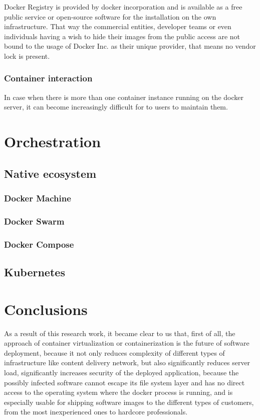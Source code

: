 Docker Registry is provided by docker incorporation and is available
as a free public service or open-source software
for the installation on the own infrastructure.
That way the commercial entities, developer teams or even individuals having a
wish to hide their images from the public access
are not bound to the usage of Docker Inc. as their unique provider, that means
no vendor lock is present.

\subsubsection{Container interaction}

In case when there is more than one container
instance running on the docker server, it can become increasingly difficult for
to users to maintain them.

\section{Orchestration}

\subsection{Native ecosystem}

\subsubsection{Docker Machine}

\subsubsection{Docker Swarm}

\subsubsection{Docker Compose}

\subsection{Kubernetes}

\section{Conclusions}

As a result of this research work, it became clear to us that, first of all,
the approach of container virtualization or containerization
is the future of software deployment, because it not only reduces complexity of
different types of infrastructure like content delivery network,
but also significantly reduces server load, significantly
increases security of the deployed application,
because the possibly infected software cannot
escape its file system layer and has no direct access
to the operating system where the docker process is running, and is
especially usable for shipping software images to the different types of customers,
from the most inexperienced ones to hardcore professionals.

